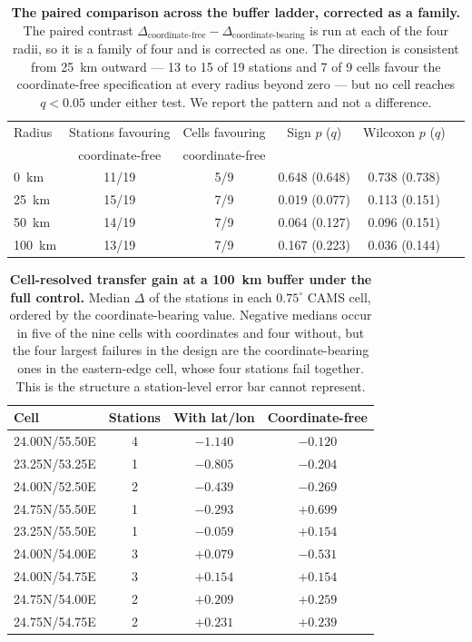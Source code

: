 \documentclass[11pt]{article}
\begin{document}
\begin{table}[htbp]\centering\footnotesize
\caption{\textbf{The paired comparison across the buffer ladder, corrected as a family.} The paired contrast $\Delta_{\text{coordinate-free}}-\Delta_{\text{coordinate-bearing}}$ is run at each of the four radii, so it is a family of four and is corrected as one. The direction is consistent from 25~km outward --- 13 to 15 of 19 stations and 7 of 9 cells favour the coordinate-free specification at every radius beyond zero --- but no cell reaches $q<0.05$ under either test. We report the pattern and not a difference.}
\begin{tabular}{lccccc}\toprule
Radius & Stations favouring & Cells favouring & Sign $p$ ($q$) & Wilcoxon $p$ ($q$) \\
 & coordinate-free & coordinate-free & & \\ \midrule
0~km & 11/19 & 5/9 & 0.648 (0.648) & 0.738 (0.738) \\
25~km & 15/19 & 7/9 & 0.019 (0.077) & 0.113 (0.151) \\
50~km & 14/19 & 7/9 & 0.064 (0.127) & 0.096 (0.151) \\
100~km & 13/19 & 7/9 & 0.167 (0.223) & 0.036 (0.144) \\
\bottomrule\end{tabular}\end{table}

\begin{table}[htbp]\centering\footnotesize
\caption{\textbf{Cell-resolved transfer gain at a 100~km buffer under the full control.} Median $\Delta$ of the stations in each $0.75^\circ$ CAMS cell, ordered by the coordinate-bearing value. Negative medians occur in five of the nine cells with coordinates and four without, but the four largest failures in the design are the coordinate-bearing ones in the eastern-edge cell, whose four stations fail together. This is the structure a station-level error bar cannot represent.}
\begin{tabular}{lccc}\toprule
Cell & Stations & With lat/lon & Coordinate-free \\ \midrule
24.00N/55.50E & 4 & $-1.140$ & $-0.120$ \\
23.25N/53.25E & 1 & $-0.805$ & $-0.204$ \\
24.00N/52.50E & 2 & $-0.439$ & $-0.269$ \\
24.75N/55.50E & 1 & $-0.293$ & $+0.699$ \\
23.25N/55.50E & 1 & $-0.059$ & $+0.154$ \\
24.00N/54.00E & 3 & $+0.079$ & $-0.531$ \\
24.00N/54.75E & 3 & $+0.154$ & $+0.154$ \\
24.75N/54.00E & 2 & $+0.209$ & $+0.259$ \\
24.75N/54.75E & 2 & $+0.231$ & $+0.239$ \\
\bottomrule\end{tabular}\end{table}
\end{document}
